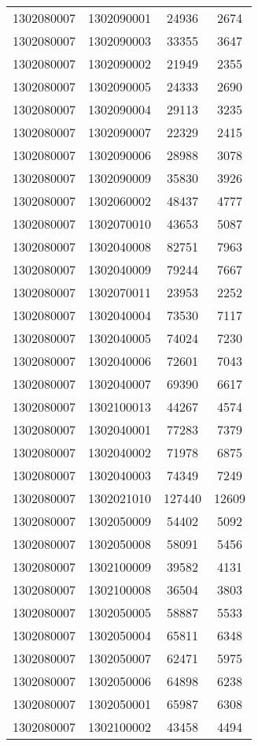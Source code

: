 \begin{longtable}[h]{llcc}
		1302080007 & 1302090001 & 24936 & 2674\\
		1302080007 & 1302090003 & 33355 & 3647\\
		1302080007 & 1302090002 & 21949 & 2355\\
		1302080007 & 1302090005 & 24333 & 2690\\
		1302080007 & 1302090004 & 29113 & 3235\\
		1302080007 & 1302090007 & 22329 & 2415\\
		1302080007 & 1302090006 & 28988 & 3078\\
		1302080007 & 1302090009 & 35830 & 3926\\
		1302080007 & 1302060002 & 48437 & 4777\\
		1302080007 & 1302070010 & 43653 & 5087\\
		1302080007 & 1302040008 & 82751 & 7963\\
		1302080007 & 1302040009 & 79244 & 7667\\
		1302080007 & 1302070011 & 23953 & 2252\\
		1302080007 & 1302040004 & 73530 & 7117\\
		1302080007 & 1302040005 & 74024 & 7230\\
		1302080007 & 1302040006 & 72601 & 7043\\
		1302080007 & 1302040007 & 69390 & 6617\\
		1302080007 & 1302100013 & 44267 & 4574\\
		1302080007 & 1302040001 & 77283 & 7379\\
		1302080007 & 1302040002 & 71978 & 6875\\
		1302080007 & 1302040003 & 74349 & 7249\\
		1302080007 & 1302021010 & 127440 & 12609\\
		1302080007 & 1302050009 & 54402 & 5092\\
		1302080007 & 1302050008 & 58091 & 5456\\
		1302080007 & 1302100009 & 39582 & 4131\\
		1302080007 & 1302100008 & 36504 & 3803\\
		1302080007 & 1302050005 & 58887 & 5533\\
		1302080007 & 1302050004 & 65811 & 6348\\
		1302080007 & 1302050007 & 62471 & 5975\\
		1302080007 & 1302050006 & 64898 & 6238\\
		1302080007 & 1302050001 & 65987 & 6308\\
		1302080007 & 1302100002 & 43458 & 4494\\

\end{longtable}
